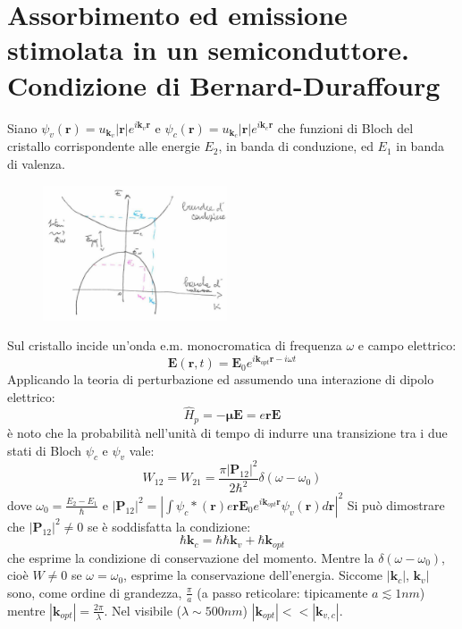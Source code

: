 \documentclass{book}
\def \*#1{\mathbf{#1}}
\def \w {\omega}
\def \l {\lambda}
\newcommand{\wh}[1] {\widehat{#1}}
\theoremstyle{remark}
\begin{document}
\section{Assorbimento ed emissione stimolata in un semiconduttore. Condizione di Bernard-Duraffourg}
Siano $\psi_v(\*r) = u_{\*k_v} |\*r| e^{i\*k_v \*r}$ e $\psi_c(\*r) = u_{\*k_c} |\*r| e^{i\*k_c \*r}$ che  funzioni di Bloch del cristallo corrispondente alle energie $E_2$, in banda di conduzione, ed $E_1$ in banda di valenza.
\begin{figure}[H]
\centering
\includegraphics[height=4cm]{images/laser_80_4}
\end{figure}
\noindent
Sul cristallo incide un'onda e.m. monocromatica di frequenza $\w$ e campo elettrico:
\begin{equation*}
\*E(\*r,t) = \*E_0 e^{i\*k_{opt} \*r - i\w t}
\end{equation*}
Applicando la teoria di perturbazione ed assumendo una interazione di dipolo elettrico:
\begin{equation*}
\wh{H}_p = -\*\mu \*E = e\*r \*E
\end{equation*}
è noto che la probabilità nell'unità di tempo di indurre una transizione tra i due stati di Bloch $\psi_c$ e $\psi_v$ vale:
\begin{equation*}
W_{12} = W_{21} = \frac{\pi |\*P_{12}|^2}{2\hbar^2} \delta(\w - \w_0)
\end{equation*}
dove $\w_0 = \frac{E_2 - E_1}{\hbar}$ e $\left|\*P_{12}\right|^2 = \left| \int \psi_c*(\*r) e \*r \*E_0 e^{i\*k_{opt} \*r} \psi_v(\*r) d\*r \right|^2$
Si può dimostrare che $|\*P_{12}|^2 \neq 0$ se è soddisfatta la condizione:
\begin{equation*}
\hbar\*k_c = \hbar \hbar \*k_v + \hbar \*k_{opt}
\end{equation*}
che esprime la condizione di conservazione del momento.
Mentre la $\delta(\w - \w_0)$, cioè $W\neq 0$ se $\w = \w_0$, esprime la conservazione dell'energia. Siccome $|\*k_c|$, $\*k_v|$ sono, come ordine di grandezza, $\frac{\pi}{a}$ (a passo reticolare: tipicamente $a \lesssim 1nm$) mentre $|\*k_{opt}| = \frac{2\pi}{\l}$. Nel visibile ($\l \sim 500 nm$) $|\*k_{opt}| << |\*k_{v,c}|$.
\end{document}

